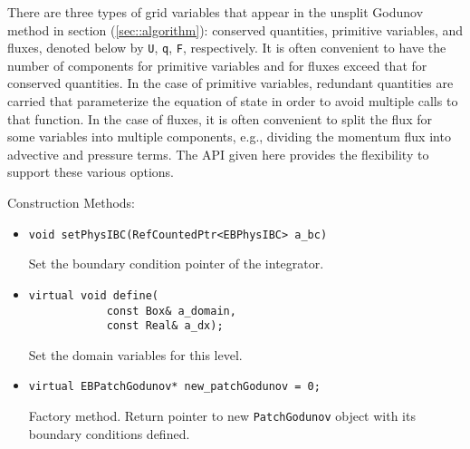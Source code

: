 There are three types of grid variables that appear in the unsplit
Godunov method in section (\ref{sec::algorithm}): conserved quantities,
primitive variables, and fluxes, denoted below by {\tt U}, {\tt q},
{\tt F}, respectively. It is
often convenient to have the number of components for primitive variables
and for fluxes exceed that for conserved quantities. In the case of
primitive variables, redundant quantities are carried that parameterize
the equation of state in order to avoid multiple calls to that function.
In the case of fluxes, it is often convenient to split the flux for some
variables into multiple components, e.g., dividing the momentum flux
into advective and pressure terms. The API given here provides the 
flexibility to support these various options.

\noindent
Construction Methods:
\begin{itemize}
\item \begin{small}\begin{verbatim}
void setPhysIBC(RefCountedPtr<EBPhysIBC> a_bc)
\end{verbatim}\end{small}
Set the boundary condition pointer of the integrator.

\item \begin{small}\begin{verbatim}
virtual void define( 
            const Box& a_domain,
            const Real& a_dx);
\end{verbatim}\end{small}
Set the domain variables for this level.

\item \begin{small}\begin{verbatim}
virtual EBPatchGodunov* new_patchGodunov = 0;
\end{verbatim}\end{small}
Factory method.   Return pointer 
to new {\tt PatchGodunov} object with
its boundary conditions defined.
\end{itemize}

